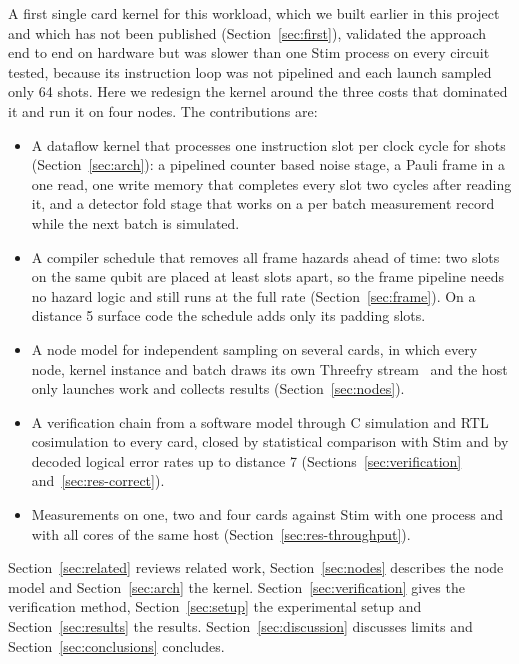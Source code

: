 A first single card kernel for this workload, which we built earlier in this project and which has not been
published (Section~\ref{sec:first}), validated the approach end to end on hardware but was slower than one Stim process on every circuit tested, because its instruction
loop was not pipelined and each launch sampled only 64 shots. Here we redesign the kernel around the three costs that
dominated it and run it on four nodes. The contributions are:
\begin{itemize}
\item A dataflow kernel that processes one instruction slot per clock cycle for \NumLanes{} shots
(Section~\ref{sec:arch}): a pipelined counter based noise stage, a Pauli frame in a one read, one write memory that
completes every slot two cycles after reading it, and a detector fold stage that works on a per batch measurement
record while the next batch is simulated.
\item A compiler schedule that removes all frame hazards ahead of time: two slots on the same qubit are placed at
least \NumHazardDistance{} slots apart, so the frame pipeline needs no hazard logic and still runs at the full rate
(Section~\ref{sec:frame}). On a distance 5 surface code the schedule adds only its \NumNopsSurfFive{} padding
slots.
\item A node model for independent sampling on several cards, in which every node, kernel instance and batch draws
its own Threefry stream~\cite{salmon2011random123} and the host only launches work and collects results
(Section~\ref{sec:nodes}).
\item A verification chain from a software model through C simulation and RTL cosimulation to every card, closed by
statistical comparison with Stim and by decoded logical error rates up to distance 7
(Sections~\ref{sec:verification} and~\ref{sec:res-correct}).
\item Measurements on one, two and four cards against Stim with one process and with all cores of the same host
(Section~\ref{sec:res-throughput}).
\end{itemize}

Section~\ref{sec:related} reviews related work, Section~\ref{sec:nodes} describes the node model and
Section~\ref{sec:arch} the kernel. Section~\ref{sec:verification} gives the verification method,
Section~\ref{sec:setup} the experimental setup and Section~\ref{sec:results} the results.
Section~\ref{sec:discussion} discusses limits and Section~\ref{sec:conclusions} concludes.
